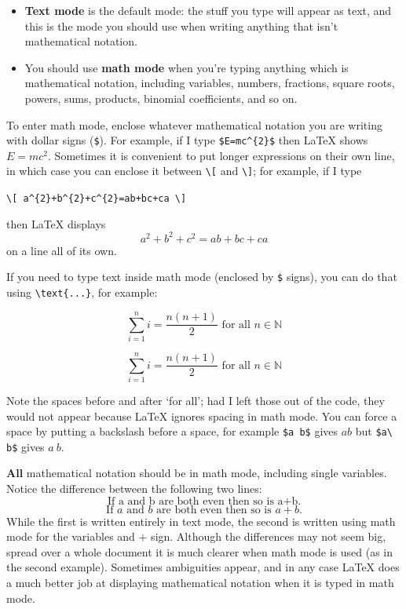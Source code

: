 \begin{itemize}
\item \textbf{Text mode} is the default mode: the stuff you type will appear as text, and this is the mode you should use when writing anything that isn't mathematical notation.
\item You should use \textbf{math mode} when you're typing anything which is mathematical notation, including variables, numbers, fractions, square roots, powers, sums, products, binomial coefficients, and so on.
\end{itemize}

To enter math mode, enclose whatever mathematical notation you are writing with dollar signs (\texttt{\${}}). For example, if I type \lstinline|$E=mc^{2}$| then \LaTeX{} shows $E=mc^2$. Sometimes it is convenient to put longer expressions on their own line, in which case you can enclose it between \lstinline|\[| and \lstinline|\]|; for example, if I type
\begin{center}\lstinline|\[ a^{2}+b^{2}+c^{2}=ab+bc+ca \]|\end{center}
then \LaTeX{} displays \[ a^{2}+b^{2}+c^{2}=ab+bc+ca \] on a line all of its own.

If you need to type text inside math mode (enclosed by \texttt{\$} signs), you can do that using \lstinline|\text{...}|, for example:

\begin{texcodeleft}[1]
\[ \sum_{i=1}^n i = \frac{n(n+1)}{2} \text{ for all } n \in \mathbb{N} \]
\end{texcodeleft}

\begin{texcoderight}[1]
\[ \sum_{i=1}^n i = \frac{n(n+1)}{2} \text{ for all } n \in \mathbb{N} \]
\end{texcoderight}

Note the spaces before and after `for all'; had I left those out of the code, they would not appear because \LaTeX{} ignores spacing in math mode. You can force a space by putting a backslash before a space, for example \lstinline|$a b$| gives $a b$ but \lstinline|$a\ b$| gives $a\ b$.

\textbf{All} mathematical notation should be in math mode, including single variables. Notice the difference between the following two lines:
\[ \text{If a and b are both even then so is a+b.} \]
\[ \text{If } a \text{ and } b \text{ are both even then so is } a+b \text{.} \]
While the first is written entirely in text mode, the second is written using math mode for the variables and $+$ sign. Although the differences may not seem big, spread over a whole document it is much clearer when math mode is used (as in the second example). Sometimes ambiguities appear, and in any case \LaTeX{} does a much better job at displaying mathematical notation when it is typed in math mode.

